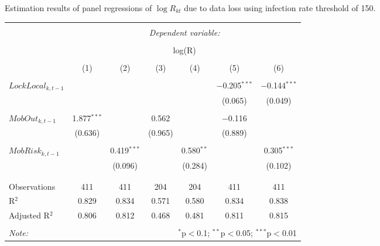  \caption{Estimation results of panel regressions of $\log R_{kt}$ due to data loss using infection rate threshold of 150.}
  
\small 
\begin{tabular}{@{\extracolsep{5pt}}lcccccc} 
\\[-1.8ex]\hline 
\hline \\[-1.8ex] 
 & \multicolumn{6}{c}{\textit{Dependent variable:}} \\ 
\cline{2-7} 
\\[-1.8ex] & \multicolumn{6}{c}{log(R)} \\ 
\\[-1.8ex] & (1) & (2) & (3) & (4) & (5) & (6)\\ 
\hline \\[-1.8ex] 
 $LockLocal_{k,t-1}$ &  &  &  &  & $-$0.205$^{***}$ & $-$0.144$^{***}$ \\ 
  &  &  &  &  & (0.065) & (0.049) \\ 
  & & & & & & \\ 
 $MobOut_{k,t-1}$ & 1.877$^{***}$ &  & 0.562 &  & $-$0.116 &  \\ 
  & (0.636) &  & (0.965) &  & (0.889) &  \\ 
  & & & & & & \\ 
 $MobRisk_{k,t-1}$ &  & 0.419$^{***}$ &  & 0.580$^{**}$ &  & 0.305$^{***}$ \\ 
  &  & (0.096) &  & (0.284) &  & (0.102) \\ 
  & & & & & & \\ 
\hline \\[-1.8ex] 
Observations & 411 & 411 & 204 & 204 & 411 & 411 \\ 
R$^{2}$ & 0.829 & 0.834 & 0.571 & 0.580 & 0.834 & 0.838 \\ 
Adjusted R$^{2}$ & 0.806 & 0.812 & 0.468 & 0.481 & 0.811 & 0.815 \\ 
\hline 
\hline \\[-1.8ex] 
\textit{Note:}  & \multicolumn{6}{r}{$^{*}$p$<$0.1; $^{**}$p$<$0.05; $^{***}$p$<$0.01} \\ 
\end{tabular} 


